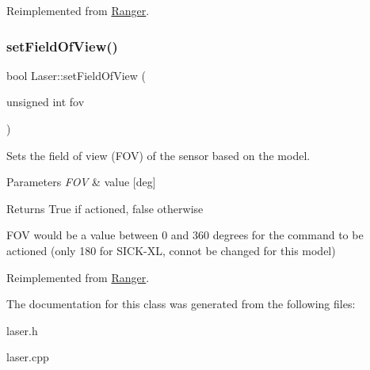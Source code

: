 Reimplemented from \hyperlink{classRanger_a3dc62dcba54eefbd7a0f08cbf97d87dc}{Ranger}.

\mbox{\label{classLaser_a5f140784aae7e82c2aa0f690548d6ebb}} 
\subsubsection{\texorpdfstring{set\+Field\+Of\+View()}{setFieldOfView()}}
{\footnotesize\ttfamily bool Laser\+::set\+Field\+Of\+View (\begin{DoxyParamCaption}\item[{unsigned int}]{fov }\end{DoxyParamCaption})\hspace{0.3cm}{\ttfamily [virtual]}}



Sets the field of view (F\+OV) of the sensor based on the model. 


\begin{DoxyParams}{Parameters}
{\em F\+OV} & value \mbox{[}deg\mbox{]} \\
\hline
\end{DoxyParams}
\begin{DoxyReturn}{Returns}
True if actioned, false otherwise
\end{DoxyReturn}
F\+OV would be a value between 0 and 360 degrees for the command to be actioned (only 180 for S\+I\+C\+K-\/\+XL, connot be changed for this model) 

Reimplemented from \hyperlink{classRanger_afb5d392ca450bcce295e61c121d09157}{Ranger}.



The documentation for this class was generated from the following files\+:\begin{DoxyCompactItemize}
\item 
laser.\+h\item 
laser.\+cpp\end{DoxyCompactItemize}
